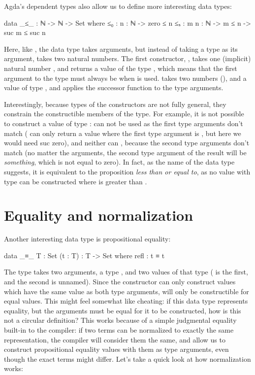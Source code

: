 		Agda's dependent types also allow us to define more interesting data
		types:

		\begin{code}
			data _≤_ : ℕ -> ℕ -> Set where
			  ≤₀ : {n : ℕ} -> zero ≤ n
			  ≤ₛ : {m n : ℕ} -> m ≤ n -> suc m ≤ suc n
		\end{code}

		Here, like \codett{\_*}, the data type  takes arguments,
		but instead of taking a type as its argument,  takes two
		natural numbers. The first constructor, , takes one
		(implicit) natural number , and returns a value of the type
		, which means that the first argument to the type must
		always be  when  is used.  takes two
		numbers (), and a value of type , and applies
		the successor function to the type arguments.

		Interestingly, because types of the constructors are not fully general,
		they constrain the constructible members of the type. For example, it
		is not possible to construct a value of type :
		 can not be used as the first type arguments don't match
		( can only return a value where the first type argument is
		, but here we would need suc zero), and neither can
		, because the second type arguments don't match (no matter
		the arguments, the second type argument of the result will be
		 \emph{something}, which is not equal to zero). In fact, as
		the name of the data type suggests, it is equivalent to the proposition
		\emph{less than or equal to}, as no value with type  can
		be constructed where  is greater than .

	\section{Equality and normalization}

		Another interesting data type is propositional equality:

		\begin{code}
			data _≡_ {T : Set} (t : T) : T -> Set where
			  refl : t ≡ t
		\end{code}

		The type  takes two arguments, a type , and two
		values of that type ( is the first, and the second is
		unnamed).  Since the constructor can only construct values which have
		the same value as both type arguments,  will only be
		constructible for equal values. This might feel somewhat like cheating:
		if this data type represents equality, but the arguments must be equal
		for it to be constructed, how is this not a circular definition? This
		works because of a simple judgmental equality built-in to the
		compiler: if two terms can be normalized to exactly the same
		representation, the compiler will consider them the same, and allow us
		to construct propositional equality values with them as type arguments,
		even though the exact terms might differ. Let's take a quick look at
		how normalization works:

